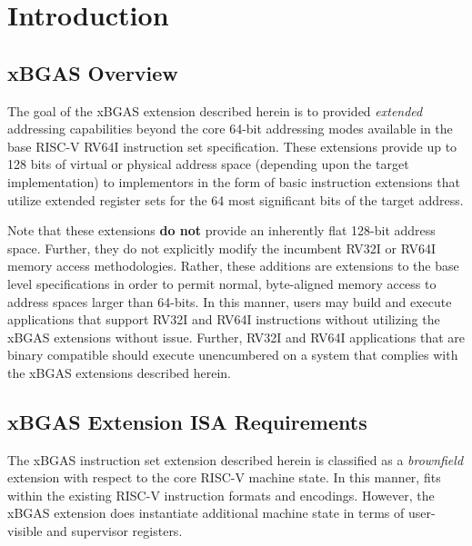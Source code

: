 \documentclass{article}
\begin{document}
\clearpage
\listoffigures
\listoftables
\clearpage

\clearpage
\section{Introduction}

\subsection{xBGAS Overview}

The goal of the \gls{xBGAS} extension described herein is to provided \textit{extended} 
addressing capabilities beyond the core 64-bit addressing modes available in the 
base RISC-V RV64I instruction set specification.  These extensions provide up 
to 128 bits of virtual or physical address space (depending upon the target implementation) 
to implementors in the form of basic instruction extensions that utilize extended 
register sets for the 64 most significant bits of the target address.  

Note that these extensions \textbf{do not} provide an inherently flat 128-bit address space.  
Further, they do not explicitly modify the incumbent RV32I or RV64I memory access 
methodologies.  Rather, these additions are extensions to the base level specifications in order to 
permit normal, byte-aligned memory access to address spaces larger than 64-bits.  In 
this manner, users may build and execute applications that support RV32I and RV64I 
instructions without utilizing the xBGAS extensions without issue.  Further, RV32I and RV64I 
applications that are binary compatible should execute unencumbered on a system that 
complies with the xBGAS extensions described herein.

\subsection{xBGAS Extension ISA Requirements}

The xBGAS instruction set extension described herein is classified 
as a \textit{brownfield} extension with respect to the core RISC-V 
machine state.  In this manner, fits within the existing RISC-V instruction 
formats and encodings.  However, the xBGAS extension does instantiate 
additional machine state in terms of user-visible and supervisor registers.
\end{document}
